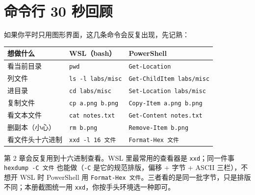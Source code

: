\documentclass[UTF8,12pt,oneside]{ctexbook}
\begin{document}
\section{命令行 30 秒回顾}
如果你平时只用图形界面，这几条命令会反复出现，先记熟：
\begin{center}
\begin{tabular}{lll}
\toprule
想做什么 & WSL（bash） & PowerShell \\
\midrule
看当前目录 & \texttt{pwd} & \texttt{Get-Location} \\
列文件 & \texttt{ls -l labs/misc} & \texttt{Get-ChildItem labs/misc} \\
进目录 & \texttt{cd labs/misc} & \texttt{Set-Location labs/misc} \\
复制文件 & \texttt{cp a.png b.png} & \texttt{Copy-Item a.png b.png} \\
看文本文件 & \texttt{cat notes.txt} & \texttt{Get-Content notes.txt} \\
删副本（小心） & \texttt{rm b.png} & \texttt{Remove-Item b.png} \\
看文件头十六进制 & \texttt{xxd -l 16 文件} & \texttt{Format-Hex 文件} \\
\bottomrule
\end{tabular}
\end{center}
第 2 章会反复用到十六进制查看。WSL 里最常用的查看器是 \verb|xxd|；同一件事 \verb|hexdump -C 文件| 也能做（\verb|-C| 是它的规范排版，偏移 + 字节 + ASCII 三栏），不想开 WSL 时 PowerShell 用 \verb|Format-Hex 文件|。三者看的是同一批字节，只是排版不同；本册截图统一用 \verb|xxd|，你按手头环境选一种即可。
\end{document}
